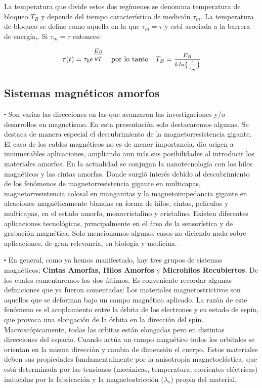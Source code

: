 La temperatura que divide estos dos regímenes se denomina temperatura de bloqueo $T_{B}$ y depende del tiempo característico de medición $\tau_{m}$. La temperatura de bloqueo se define como aquella en la que $\tau_{m}=\tau$ y
está asociada a la barrera de energía,. Si $\tau_{m}=\tau$ entonces:


\begin{equation}
	\tau(t)=\tau_{0} e^{\mfrac{E_{B}}{kT}} \quad \text{por lo tanto} \quad T_{B}=\mfrac{E_{B}}{k\, ln \big(\mfrac{\tau}{\tau_{m}} \big)} 
\end{equation}


\subsection{Sistemas magnéticos amorfos}


$\centerdot$ Son varias las direcciones en las que avanzaron las investigaciones y/o desarrollos en magnetismo. En esta presentación solo destacaremos algunas. Se destaca de manera especial el descubrimiento de la magnetorresistencia gigante. El caso de los cables magnéticos no es de menor importancia, dio origen a innumerables aplicaciones, ampliando aun más sus posibilidades al introducir los materiales amorfos. En la actualidad se conjugan la nanotecnología con los hilos magnéticos y las cintas amorfas. Donde surgió interés debido al descubrimiento de los fenómenos de magnetorresistencia gigante en multicapas, magnetorresistencia colosal en manganitas y la magnetoimpedancia gigante en aleaciones magnéticamente blandas en forma de hilos, cintas, películas y multicapas, en el estado amorfo, monocristalino y cristalino. Existen diferentes aplicaciones tecnológicas, principalmente en el área de la sensorística y de grabación magnética. Solo mencionamos algunos casos no diciendo nada sobre aplicaciones, de gran relevancia, en biología y medicina.

$\centerdot$  En general, como ya hemos manifestado, hay tres grupos de sistemas magnéticos; \textbf{Cintas Amorfas, Hilos Amorfos} y \textbf{Microhilos Recubiertos}. De los cuales comentaremos los dos últimos. Es conveniente recordar algunas definiciones que ya fueron comentadas: Los materiales magnetostrictivos son aquellos que se deforman bajo un campo magnético aplicado. La razón de este fenómeno es el acoplamiento entre la órbita de los electrones y su estado de espín, que provoca una elongación de la órbita en la dirección del spin. Macroscópicamente, todas las orbitas están elongadas pero en distintas direcciones del espacio. Cuando actúa un campo magnético todos los orbitales se orientan en la misma dirección y cambia de dimensión el cuerpo. Estos materiales deben sus propiedades fundamentalmente por la anisotropía magnetoelástica, que está determinada por las tensiones (mecánicas, temperatura, corrientes eléctricas) inducidas por la fabricación y la magnetostricción ($\lambda_{s}$) propia del material.

